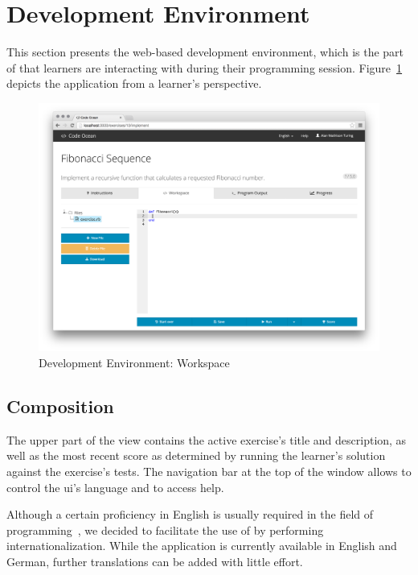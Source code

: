 \section{Development Environment}\label{section:development-environment3}

This section presents the web-based development environment, which is the part of \tool that learners are interacting with during their programming session. Figure~\ref{figure:development-environment1} depicts the application from a learner's perspective.

\begin{figure}
\centering
\includegraphics[width=\textwidth]{images/development-environment1.png}
\vspace{-1cm}
\caption{Development Environment: Workspace}
\label{figure:development-environment1}
\end{figure}

\subsection{Composition}

The upper part of the view contains the active exercise's title and description, as well as the most recent score as determined by running the learner's solution against the exercise's tests. The navigation bar at the top of the window allows to control the \gls{ui}'s language and to access help.

Although a certain proficiency in English is usually required in the field of programming~\cite{staubitz2014lightweight}, we decided to facilitate the use of \tool by performing internationalization. While the application is currently available in English and German, further translations can be added with little effort.

